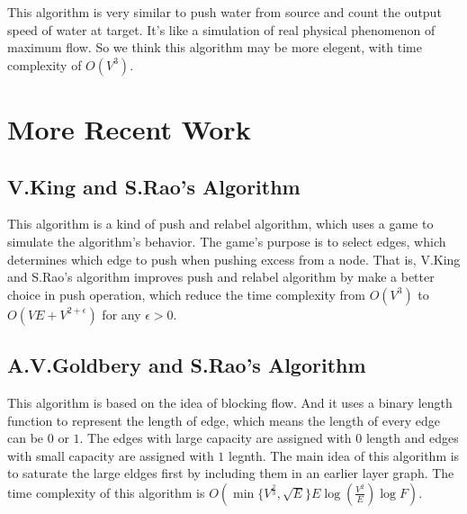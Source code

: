 \documentclass[twocolumn,9pt]{extarticle}
\begin{document}
This algorithm is very similar to push water from source and count the output speed of water at target. It's like a 
simulation of real physical phenomenon of maximum flow. So we think this algorithm may be more elegent, with time complexity of $O(V^3)$.

\section{More Recent Work}

\subsection{V.King and S.Rao's Algorithm}
This algorithm is a kind of push and relabel algorithm, which uses a game to simulate the algorithm's behavior. The game's purpose is to select edges, which determines which edge to push when pushing excess from a node. That is, V.King and S.Rao's algorithm improves push and relabel algorithm by make a better choice in push operation, which reduce the time complexity from $O(V^3)$ to $O(VE+V^{2+\epsilon})$ for any $\epsilon > 0$.

\subsection{A.V.Goldbery and S.Rao's Algorithm}
This algorithm is based on the idea of blocking flow. And it uses a binary length function to represent the length of edge, which means the length of every edge can be $0$ or $1$. The edges with large capacity are assigned with $0$ length and edges with small capacity are assigned with $1$ legnth. The main idea of this algorithm is to saturate the large eldges first by including them in an earlier layer graph. The time complexity of this algorithm is $O(\min\{V^\frac{2}{3},\sqrt{E}\}E\log(\frac{V^2}{E})\log{F})$.
\end{document}
